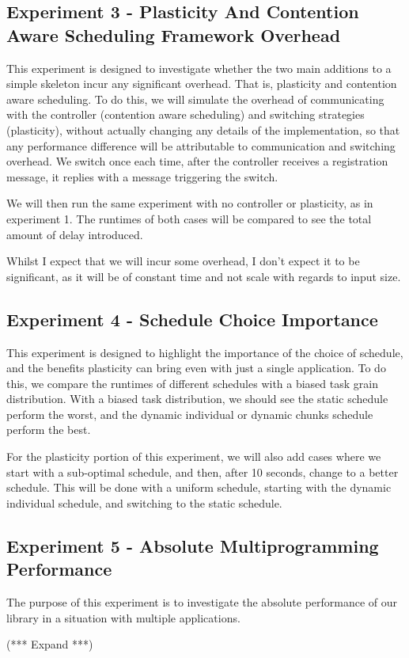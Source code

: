 



\subsection{Experiment 3 - Plasticity And Contention Aware Scheduling Framework Overhead}

This experiment is designed to investigate whether the two main additions to a simple skeleton incur any significant overhead. That is, plasticity and contention aware scheduling. To do this, we will simulate the overhead of communicating with the controller (contention aware scheduling) and switching strategies (plasticity), without actually changing any details of the implementation, so that any performance difference will be attributable to communication and switching overhead. We switch once each time, after the controller receives a registration message, it replies with a message triggering the switch.

We will then run the same experiment with no controller or plasticity, as in experiment 1. The runtimes of both cases will be compared to see the total amount of delay introduced.

Whilst I expect that we will incur some overhead, I don't expect it to be significant, as it will be of constant time and not scale with regards to input size.





\subsection{Experiment 4 - Schedule Choice Importance}

This experiment is designed to highlight the importance of the choice of schedule, and the benefits plasticity can bring even with just a single application. To do this, we compare the runtimes of different schedules with a biased task grain distribution. With a biased task distribution, we should see the static schedule perform the worst, and the dynamic individual or dynamic chunks schedule perform the best.

For the plasticity portion of this experiment, we will also add cases where we start with a sub-optimal schedule, and then, after 10 seconds, change to a better schedule. This will be done with a uniform schedule, starting with the dynamic individual schedule, and switching to the static schedule.





\subsection{Experiment 5 - Absolute Multiprogramming Performance}

The purpose of this experiment is to investigate the absolute performance of our library in a situation with multiple applications. 

(*** Expand ***)

